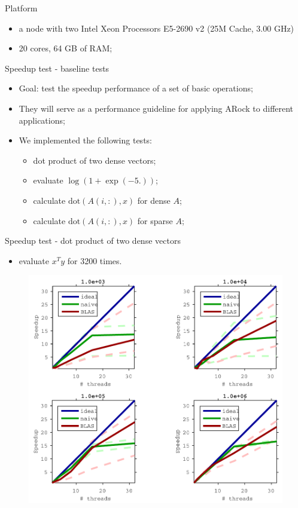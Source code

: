 \documentclass[hyperref,handout,compress,9pt,mathserif]{beamer}
\begin{document}
\begin{frame} {Platform}
\begin{itemize}
\item a node with two Intel Xeon Processors E5-2690 v2 (25M Cache, 3.00 GHz)
\item 20 cores, 64 GB of RAM;
\end{itemize}


\end{frame}


\begin{frame}{Speedup test - baseline tests}
\begin{itemize}
\item Goal: test the speedup performance of a set of basic operations;
\item They will serve as a performance guideline for applying ARock to different applications;
\item We implemented the following tests:
\begin{itemize}
\item dot product of two dense vectors;
\item evaluate $\log(1 + \exp(-5.))$;
\item calculate $\text{dot}(A(i, :), x)$ for dense $A$;
\item calculate $\text{dot}(A(i, :), x)$ for sparse $A$; 

\end{itemize}
\end{itemize}

\end{frame}

\begin{frame}{Speedup test - dot product of two dense vectors}
\begin{itemize}
\item evaluate $x^T y$ for 3200 times.
\end{itemize}


\begin{figure}[!h]
        \centering
                \includegraphics[width=.8\textwidth]{./figs/ds_vec_dot_prod_cropped.pdf}
\end{figure}

\end{frame}
\end{document}
